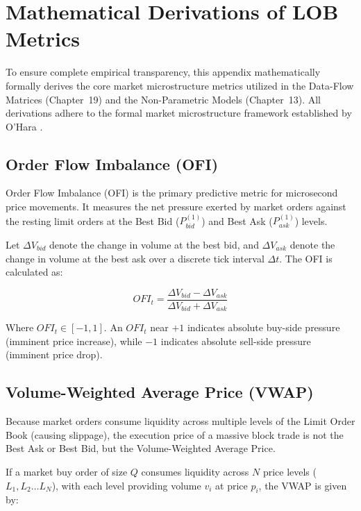 \chapter{Mathematical Derivations of LOB Metrics}
\label{ch:mathematical_derivations}

To ensure complete empirical transparency, this appendix mathematically formally derives the core market microstructure metrics utilized in the Data-Flow Matrices (Chapter~19) and the Non-Parametric Models (Chapter~13). All derivations adhere to the formal market microstructure framework established by O'Hara \cite{ohara1995market}.

\section{Order Flow Imbalance (OFI)}

Order Flow Imbalance (OFI) is the primary predictive metric for microsecond price movements. It measures the net pressure exerted by market orders against the resting limit orders at the Best Bid ($P_{bid}^{(1)}$) and Best Ask ($P_{ask}^{(1)}$) levels.

Let $\Delta V_{bid}$ denote the change in volume at the best bid, and $\Delta V_{ask}$ denote the change in volume at the best ask over a discrete tick interval $\Delta t$. The OFI is calculated as:

\begin{equation}
    OFI_t = \frac{\Delta V_{bid} - \Delta V_{ask}}{\Delta V_{bid} + \Delta V_{ask}}
\end{equation}

Where $OFI_t \in [-1, 1]$. An $OFI_t$ near $+1$ indicates absolute buy-side pressure (imminent price increase), while $-1$ indicates absolute sell-side pressure (imminent price drop).

\section{Volume-Weighted Average Price (VWAP)}

Because market orders consume liquidity across multiple levels of the Limit Order Book (causing slippage), the execution price of a massive block trade is not the Best Ask or Best Bid, but the Volume-Weighted Average Price.

If a market buy order of size $Q$ consumes liquidity across $N$ price levels ($L_1, L_2 \dots L_N$), with each level providing volume $v_i$ at price $p_i$, the VWAP is given by:

